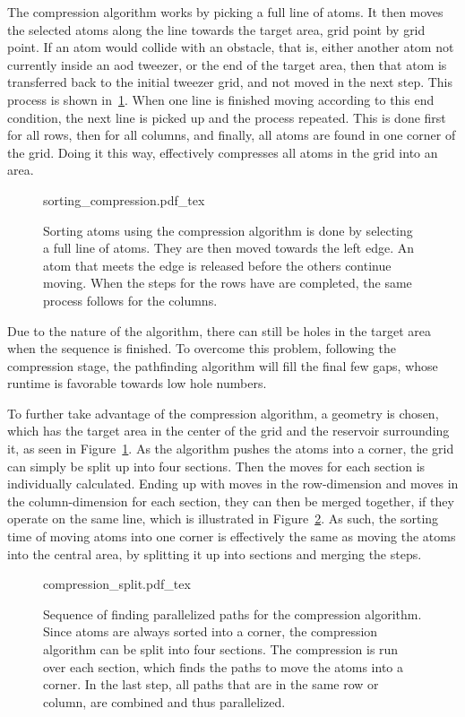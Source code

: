 The compression algorithm works by picking a full line of atoms. It then moves the selected atoms along the line towards the target area, grid point by grid point. If an atom would collide with an obstacle, that is, either another atom not currently inside an \ac{aod} tweezer, or the end of the target area, then that atom is transferred back to the initial tweezer grid, and not moved in the next step. This process is shown in~\ref{fig:sorting_compression}. When one line is finished moving according to this end condition, the next line is picked up and the process repeated. This is done first for all rows, then for all columns, and finally, all atoms are found in one corner of the grid. Doing it this way, effectively compresses all atoms in the grid into an area.

\begin{figure}[tbp]%
\centering
{sorting_compression.pdf_tex}
\caption{Sorting atoms using the compression algorithm is done by selecting a full line of atoms. They are then moved towards the left edge. An atom that meets the edge is released before the others continue moving. When the steps for the rows have are completed, the same process follows for the columns.}%
\label{fig:sorting_compression}
\end{figure}

Due to the nature of the algorithm, there can still be holes in the target area when the sequence is finished. To overcome this problem, following the compression stage, the pathfinding algorithm will fill the final few gaps, whose runtime is favorable towards low hole numbers.

To further take advantage of the compression algorithm, a geometry is chosen, which has the target area in the center of the grid and the reservoir surrounding it, as seen in Figure~\ref{fig:sorting_compression}. As the algorithm pushes the atoms into a corner, the grid can simply be split up into four sections. Then the moves for each section is individually calculated. Ending up with moves in the row-dimension and moves in the column-dimension for each section, they can then be merged together, if they operate on the same line, which is illustrated in Figure~\ref{fig:compression_split}. As such, the sorting time of moving atoms into one corner is effectively the same as moving the atoms into the central area, by splitting it up into sections and merging the steps.

\begin{figure}[tbp]%
\centering
{compression_split.pdf_tex}
\caption{Sequence of finding parallelized paths for the compression algorithm. Since atoms are always sorted into a corner, the compression algorithm can be split into four sections. The compression is run over each section, which finds the paths to move the atoms into a corner. In the last step, all paths that are in the same row or column, are combined and thus parallelized.}%
\label{fig:compression_split}
\end{figure}

